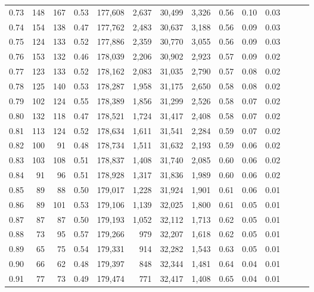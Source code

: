 \begin{tabular}{rrrrrrrrrrrrrr}
0.73 &    148 &  167 &  0.53 &  177,608 &    2,637 &  30,499 &   3,326 &  0.56 &  0.10 &      0.03 \\
0.74 &    154 &  138 &  0.47 &  177,762 &    2,483 &  30,637 &   3,188 &  0.56 &  0.09 &      0.03 \\
0.75 &    124 &  133 &  0.52 &  177,886 &    2,359 &  30,770 &   3,055 &  0.56 &  0.09 &      0.03 \\
0.76 &    153 &  132 &  0.46 &  178,039 &    2,206 &  30,902 &   2,923 &  0.57 &  0.09 &      0.02 \\
0.77 &    123 &  133 &  0.52 &  178,162 &    2,083 &  31,035 &   2,790 &  0.57 &  0.08 &      0.02 \\
0.78 &    125 &  140 &  0.53 &  178,287 &    1,958 &  31,175 &   2,650 &  0.58 &  0.08 &      0.02 \\
0.79 &    102 &  124 &  0.55 &  178,389 &    1,856 &  31,299 &   2,526 &  0.58 &  0.07 &      0.02 \\
0.80 &    132 &  118 &  0.47 &  178,521 &    1,724 &  31,417 &   2,408 &  0.58 &  0.07 &      0.02 \\
0.81 &    113 &  124 &  0.52 &  178,634 &    1,611 &  31,541 &   2,284 &  0.59 &  0.07 &      0.02 \\
0.82 &    100 &   91 &  0.48 &  178,734 &    1,511 &  31,632 &   2,193 &  0.59 &  0.06 &      0.02 \\
0.83 &    103 &  108 &  0.51 &  178,837 &    1,408 &  31,740 &   2,085 &  0.60 &  0.06 &      0.02 \\
0.84 &     91 &   96 &  0.51 &  178,928 &    1,317 &  31,836 &   1,989 &  0.60 &  0.06 &      0.02 \\
0.85 &     89 &   88 &  0.50 &  179,017 &    1,228 &  31,924 &   1,901 &  0.61 &  0.06 &      0.01 \\
0.86 &     89 &  101 &  0.53 &  179,106 &    1,139 &  32,025 &   1,800 &  0.61 &  0.05 &      0.01 \\
0.87 &     87 &   87 &  0.50 &  179,193 &    1,052 &  32,112 &   1,713 &  0.62 &  0.05 &      0.01 \\
0.88 &     73 &   95 &  0.57 &  179,266 &      979 &  32,207 &   1,618 &  0.62 &  0.05 &      0.01 \\
0.89 &     65 &   75 &  0.54 &  179,331 &      914 &  32,282 &   1,543 &  0.63 &  0.05 &      0.01 \\
0.90 &     66 &   62 &  0.48 &  179,397 &      848 &  32,344 &   1,481 &  0.64 &  0.04 &      0.01 \\
0.91 &     77 &   73 &  0.49 &  179,474 &      771 &  32,417 &   1,408 &  0.65 &  0.04 &      0.01 \\

\end{tabular}
